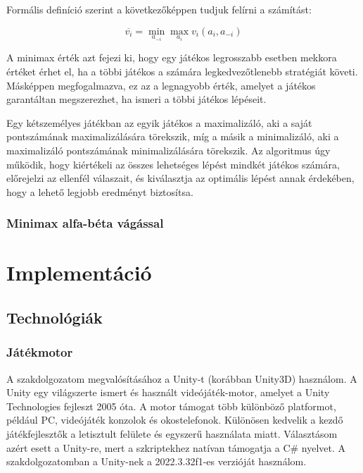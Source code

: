 \documentclass[
]{thesis-ekf}
\theoremstyle{definition}
\theoremstyle{remark}
\begin{document}
Formális definíció szerint a következőképpen tudjuk felírni a számítást:

\begin{equation*}
\overline{v_{i}}=\underset{{a_{-i}}}{\min} \underset{{a_{i}}}{\max} v_{i}(a_{i}, a_{-i})
\end{equation*}

A minimax érték azt fejezi ki, hogy egy játékos legrosszabb esetben mekkora értéket érhet el, ha a többi játékos a számára legkedvezőtlenebb stratégiát követi. Másképpen megfogalmazva, ez az a legnagyobb érték, amelyet a játékos garantáltan megszerezhet, ha ismeri a többi játékos lépéseit. 

Egy kétszemélyes játékban az egyik játékos a maximalizáló, aki a saját pontszámának maximalizálására törekszik, míg a másik a minimalizáló, aki a maximalizáló pontszámának minimalizálására törekszik. Az algoritmus úgy működik, hogy kiértékeli az összes lehetséges lépést mindkét játékos számára, előrejelzi az ellenfél válaszait, és kiválasztja az optimális lépést annak érdekében, hogy a lehető legjobb eredményt biztosítsa. \cite{MiniMaxGfG}

\subsection{Minimax alfa-béta vágással}

\chapter{Implementáció}

\section{Technológiák}

\subsection{Játékmotor}

A szakdolgozatom megvalósításához a Unity-t (korábban Unity3D) használom. A Unity egy világszerte ismert és használt videójáték-motor, amelyet a Unity Technologies fejleszt 2005 óta. A motor támogat több különböző platformot, például PC, videójáték konzolok és okostelefonok. Különösen kedvelik a kezdő játékfejlesztők a letisztult felülete és egyszerű használata miatt. Választásom azért esett a Unity-re, mert a szkriptekhez natívan támogatja a C\# nyelvet. A szakdolgozatomban a Unity-nek a 2022.3.32f1-es verzióját használom.
\end{document}

